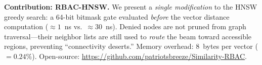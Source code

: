 \smallskip\noindent\textbf{Contribution: RBAC-HNSW.}
We present a \emph{single modification} to the HNSW greedy search: a 64-bit
bitmask gate evaluated \emph{before} the vector distance computation
(${\approx}1$~ns vs.\ ${\approx}30$~ns).
Denied nodes are not pruned from graph traversal---their neighbor lists are
still used to \emph{route} the beam toward accessible regions, preventing
``connectivity deserts.''
Memory overhead: $8$~bytes per vector ($=\mathbf{0.24\%}$).
Open-source: \url{https://github.com/patriotsbreeze/Similarity-RBAC}.
